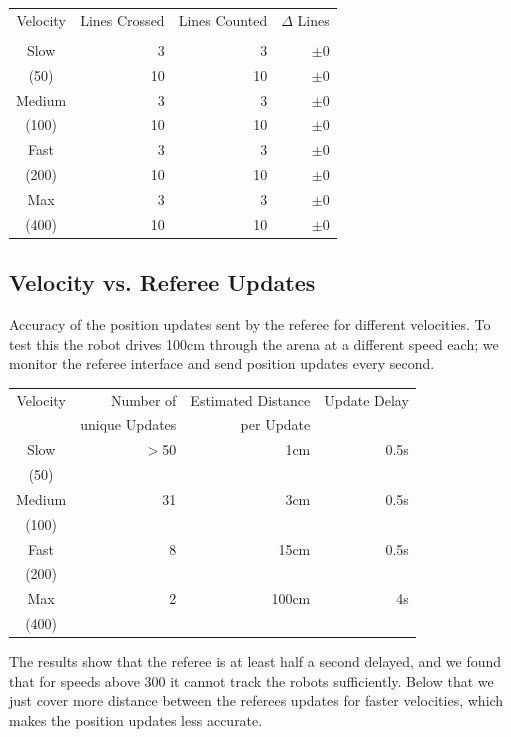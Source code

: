 \documentclass[12pt]{article}
\begin{document}
\begin{tabular}{ | c || r | r | r | }
\hline
Velocity & Lines Crossed & Lines Counted & $\Delta$ Lines \\
 & & &  \\ \hline
Slow & 3 & 3 & $\pm 0$  \\ \hline
(50) & 10 & 10 & $\pm 0$  \\ \hline
Medium & 3 & 3 & $\pm 0$  \\ \hline
(100)  & 10 & 10 & $\pm 0$  \\ \hline
Fast & 3 & 3 & $\pm 0$ \\ \hline
(200) & 10 & 10 & $\pm 0$ \\ \hline
Max & 3 & 3 & $\pm 0$  \\ \hline
(400) & 10 & 10 & $\pm 0$  \\ \hline
\end{tabular}

\subsection*{Velocity vs. Referee Updates}
Accuracy of the position updates sent by the referee for different velocities.
To test this the robot drives 100cm through the arena at a different speed each; 
we monitor the referee interface and send position updates every second.


\begin{tabular}{ | c || r | r | r | }
\hline
Velocity & Number of & Estimated Distance & Update Delay \\
  & unique Updates & per Update &  \\ \hline
Slow & $>$50 & ~1cm & 0.5s  \\ 
(50) &  & &  \\ \hline
Medium & 31 & 3cm & 0.5s \\ 
(100) &  &  &  \\ \hline
Fast & 8 & 15cm & 0.5s \\ 
(200) &  &  &  \\ \hline
Max & 2 & 100cm & 4s \\ 
(400) &  &  &  \\ \hline
\end{tabular}

The results show that the referee is at least half a second delayed, and we found that for speeds above 300 it cannot track the robots sufficiently. Below that we just cover more distance between the referees updates for faster velocities, which makes the position updates less accurate.
\end{document}
